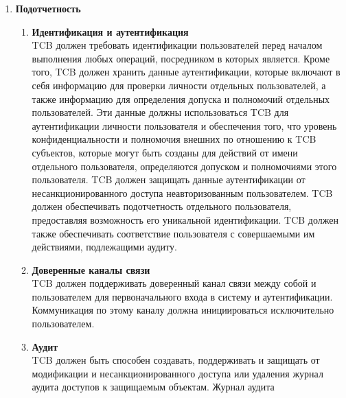 \begin{enumerate}
\begin{enumerate}
\begin{enumerate}
\begin{enumerate}
				писать в объект только если иерархическая классификация уровня конфиденциальности субъекта меньше или равна иерархической классификации уровня конфиденциальности объекта, и все
				неиерархические категории уровня конфиденциальности субъекта включены в неиерархические категории уровня конфиденциальности объекта. Идентификационные и аутентификационные данные должны
				использоваться TCB для удостоверения личности пользователя и для обеспечения того, чтобы уровень конфиденциальности и авторизация субъектов, внешних для TCB, которые могут быть созданы для
				деятельности от имени отдельного пользователя, определялись уровнем доступа и авторизацией этого пользователя.
			\end{enumerate}
			\item{\textbf{Подотчетность}}
			\begin{enumerate}
				\item{\textbf{Идентификация и аутентификация}}\\
				TCB должен требовать идентификации пользователей перед началом выполнения любых операций, посредником в которых является. Кроме того, TCB должен хранить данные аутентификации,
				которые включают в себя информацию для проверки личности отдельных пользователей, а также информацию для определения допуска и полномочий отдельных пользователей. Эти данные должны
				использоваться TCB для аутентификации личности пользователя и обеспечения того, что уровень конфиденциальности и полномочия внешних по отношению к TCB субъектов, которые
				могут быть созданы для действий от имени отдельного пользователя, определяются допуском и полномочиями этого пользователя. TCB должен защищать данные аутентификации от
				несанкционированного доступа неавторизованным пользователем. TCB должен обеспечивать подотчетность отдельного пользователя, предоставляя возможность его уникальной идентификации.
				TCB должен также обеспечивать соответствие пользователя с совершаемыми им действиями, подлежащими аудиту.
				\item{\textbf{Доверенные каналы	связи}}\\
				TCB должен поддерживать доверенный канал связи между собой и пользователем для первоначального входа в систему и аутентификации. Коммуникация по этому каналу должна
				инициироваться исключительно пользователем.
				\item{\textbf{Аудит}}\\
				TCB должен быть способен создавать, поддерживать и защищать от модификации и несанкционированного доступа или удаления журнал аудита доступов к защищаемым объектам. Журнал аудита

\end{enumerate}
\end{enumerate}
\end{enumerate}
\end{enumerate}

